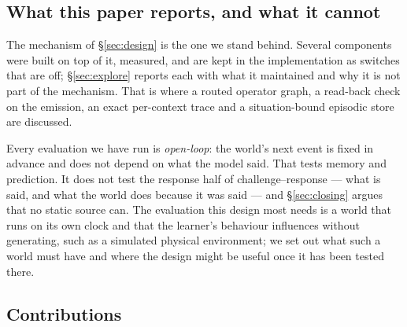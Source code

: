 \documentclass[11pt,a4paper]{article}
\theoremstyle{plain}
\theoremstyle{definition}
\theoremstyle{remark}
\begin{document}
\subsection{What this paper reports, and what it cannot}

The mechanism of \S\ref{sec:design} is the one we stand behind. Several
components were built on top of it, measured, and are kept in the
implementation as switches that are off; \S\ref{sec:explore} reports each with
what it maintained and why it is not part of the mechanism. That is where a
routed operator graph, a read-back check on the emission, an exact per-context
trace and a situation-bound episodic store are discussed.

Every evaluation we have run is \emph{open-loop}: the world's next event is
fixed in advance and does not depend on what the model said. That tests memory
and prediction. It does not test the response half of challenge--response ---
what is said, and what the world does because it was said --- and
\S\ref{sec:closing} argues that no static source can. The evaluation this design
most needs is a world that runs on its own clock and that the learner's
behaviour influences without generating, such as a simulated physical
environment; we set out what such a world must have and where the design might
be useful once it has been tested there.

\subsection{Contributions}
\end{document}
